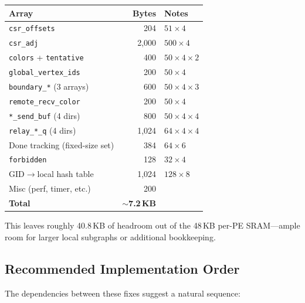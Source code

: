 \documentclass[11pt,letterpaper]{article}
\begin{document}
\begin{center}
\renewcommand{\arraystretch}{1.2}
\begin{tabular}{lrl}
\toprule
\textbf{Array} & \textbf{Bytes} & \textbf{Notes} \\
\midrule
\texttt{csr\_offsets} & 204 & $51 \times 4$ \\
\texttt{csr\_adj} & 2{,}000 & $500 \times 4$ \\
\texttt{colors} + \texttt{tentative} & 400 & $50 \times 4 \times 2$ \\
\texttt{global\_vertex\_ids} & 200 & $50 \times 4$ \\
\texttt{boundary\_*} (3 arrays) & 600 & $50 \times 4 \times 3$ \\
\texttt{remote\_recv\_color} & 200 & $50 \times 4$ \\
\texttt{*\_send\_buf} (4 dirs) & 800 & $50 \times 4 \times 4$ \\
\texttt{relay\_*\_q} (4 dirs) & 1{,}024 & $64 \times 4 \times 4$ \\
Done tracking (fixed-size set) & 384 & $64 \times 6$ \\
\texttt{forbidden} & 128 & $32 \times 4$ \\
GID$\to$local hash table & 1{,}024 & $128 \times 8$ \\
Misc (perf, timer, etc.) & 200 & \\
\midrule
\textbf{Total} & \textbf{$\sim$7.2\,KB} & \\
\bottomrule
\end{tabular}
\end{center}

This leaves roughly 40.8\,KB of headroom out of the 48\,KB per-PE SRAM---ample
room for larger local subgraphs or additional bookkeeping.

\subsection{Recommended Implementation Order}

The dependencies between these fixes suggest a natural sequence:
\end{document}
